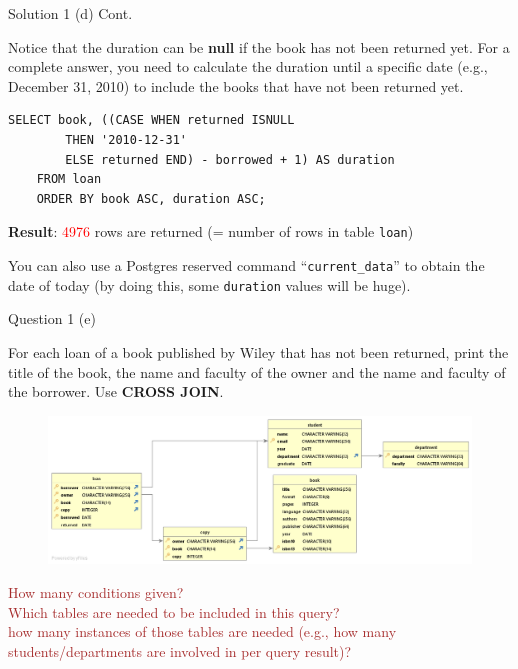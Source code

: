 \begin{frame}[fragile]{Solution 1 (d) Cont.}
	
Notice that the duration can be \textbf{null} if the book has not been returned yet. For a complete answer, you need to calculate the duration until a specific date (e.g., December 31, 2010) to include the books that have not been returned yet. \vspace{10pt}
	
\begin{lstlisting}
SELECT book, ((CASE	WHEN returned ISNULL 
		THEN '2010-12-31'
		ELSE returned END) - borrowed + 1) AS duration 
	FROM loan
	ORDER BY book ASC, duration ASC;
\end{lstlisting}
\vspace{10pt}
 
\textbf{Result}: \textcolor{red}{4976} rows are returned (= number of rows in table \texttt{loan})

\begin{exampleblock}{}
	You can also use a Postgres reserved command ``\texttt{current\_data}'' to obtain the date of today (by doing this, some \texttt{duration} values will be huge). 
\end{exampleblock}	
\end{frame}


\begin{frame}[fragile]{Question 1 (e)}

For each loan of a book published by Wiley that has not been returned, print the title of the book, the name and faculty of the owner and the name and faculty of the borrower. Use \textbf{CROSS JOIN}.

\begin{figure}
	\includegraphics[width=1\textwidth]{t1/images/t1-end.png}
\end{figure}

\textcolor{brown}{\scriptsize How many conditions given?\\
	Which tables are needed to be included in this query? \\
	how many instances of those tables are needed (e.g., how many students/departments are involved in per query result)?}
\end{frame}

